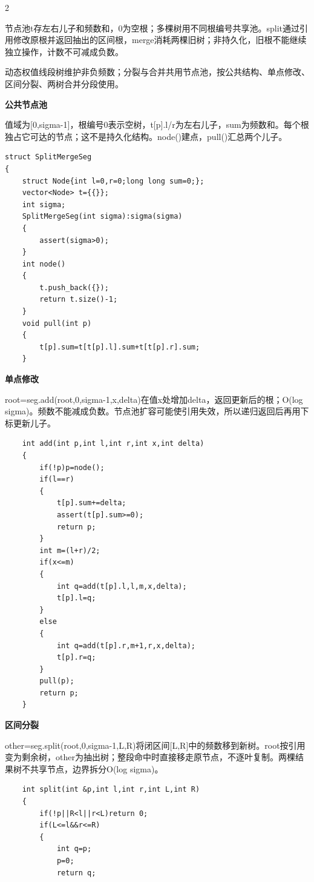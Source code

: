 \documentclass[UTF8,fontset=fandol,a4paper,twoside]{ctexart}
\newcommand{\topic}[1]{\par\smallskip\textbf{#1}\par\nobreak}
\newcommand{\note}[1]{{\fontsize{10}{12}\selectfont #1\par}}
\begin{document}
\begin{multicols}{2}
\note{节点池t存左右儿子和频数和，0为空根；多棵树用不同根编号共享池。split通过引用修改原根并返回抽出的区间根，merge消耗两棵旧树；非持久化，旧根不能继续独立操作，计数不可减成负数。}
\note{动态权值线段树维护非负频数；分裂与合并共用节点池，按公共结构、单点修改、区间分裂、两树合并分段使用。}
\topic{公共节点池}
\note{值域为[\allowbreak{}0,\allowbreak{}sigma-\allowbreak{}1]\allowbreak{}，根编号0表示空树，t[\allowbreak{}p]\allowbreak{}.\allowbreak{}l/\allowbreak{}r为左右儿子，sum为频数和。每个根独占它可达的节点；这不是持久化结构。node(\allowbreak{})\allowbreak{}建点，pull(\allowbreak{})\allowbreak{}汇总两个儿子。}
\begin{lstlisting}
struct SplitMergeSeg
{
    struct Node{int l=0,r=0;long long sum=0;};
    vector<Node> t={{}};
    int sigma;
    SplitMergeSeg(int sigma):sigma(sigma)
    {
        assert(sigma>0);
    }
    int node()
    {
        t.push_back({});
        return t.size()-1;
    }
    void pull(int p)
    {
        t[p].sum=t[t[p].l].sum+t[t[p].r].sum;
    }
\end{lstlisting}
\topic{单点修改}
\note{root=\allowbreak{}seg.\allowbreak{}add(\allowbreak{}root,\allowbreak{}0,\allowbreak{}sigma-\allowbreak{}1,\allowbreak{}x,\allowbreak{}delta)\allowbreak{}在值x处增加delta，返回更新后的根；O(\allowbreak{}log sigma)\allowbreak{}。频数不能减成负数。节点池扩容可能使引用失效，所以递归返回后再用下标更新儿子。}
\begin{lstlisting}
    int add(int p,int l,int r,int x,int delta)
    {
        if(!p)p=node();
        if(l==r)
        {
            t[p].sum+=delta;
            assert(t[p].sum>=0);
            return p;
        }
        int m=(l+r)/2;
        if(x<=m)
        {
            int q=add(t[p].l,l,m,x,delta);
            t[p].l=q;
        }
        else
        {
            int q=add(t[p].r,m+1,r,x,delta);
            t[p].r=q;
        }
        pull(p);
        return p;
    }
\end{lstlisting}
\topic{区间分裂}
\note{other=\allowbreak{}seg.\allowbreak{}split(\allowbreak{}root,\allowbreak{}0,\allowbreak{}sigma-\allowbreak{}1,\allowbreak{}L,\allowbreak{}R)\allowbreak{}将闭区间[\allowbreak{}L,\allowbreak{}R]\allowbreak{}中的频数移到新树。root按引用变为剩余树，other为抽出树；整段命中时直接移走原节点，不逐叶复制。两棵结果树不共享节点，边界拆分O(\allowbreak{}log sigma)\allowbreak{}。}
\begin{lstlisting}
    int split(int &p,int l,int r,int L,int R)
    {
        if(!p||R<l||r<L)return 0;
        if(L<=l&&r<=R)
        {
            int q=p;
            p=0;
            return q;

\end{lstlisting}
\end{multicols}
\end{document}
